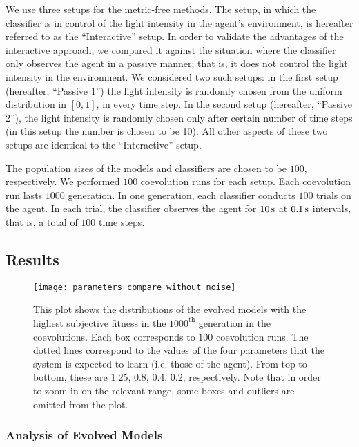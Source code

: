 We use three setups for the metric-free methods. The setup, in which the classifier is in control of the light intensity in the agent's environment, is hereafter referred to as the ``Interactive'' setup. In order to validate the advantages of the interactive approach, we compared it against the situation where the classifier only observes the agent in a passive manner; that is, it does not control the light intensity in the environment. We considered two such setups: in the first setup (hereafter, ``Passive 1'') the light intensity is randomly chosen from the uniform distribution in $\left[0,1\right]$, in every time step. In the second setup (hereafter, ``Passive 2''), the light intensity is randomly chosen only after certain number of time steps (in this setup the number is chosen to be 10). All other aspects of these two setups are identical to the ``Interactive'' setup. 

The population sizes of the models and classifiers are chosen to be $100$, respectively. We performed $100$ coevolution runs for each setup. Each coevolution run lasts $1000$ generation. In one generation, each classifier conducts $100$ trials on the agent. In each trial, the classifier observes the agent for $\unit[10]{s}$ at $\unit[0.1]{s}$ intervals, that is, a total of $100$ time steps.

\subsection{Results}\label{sec:results_interaction_deterministic}

\begin{figure}[!t]%
	\centering
	\texttt{[image: parameters\_compare\_without\_noise]}
	\caption{This plot shows the distributions of the evolved models with the highest subjective fitness in the $1000^\textrm{th}$ generation in the coevolutions. Each box corresponds to $100$ coevolution runs. The dotted lines correspond to the values of the four parameters that the system is expected to learn (i.e. those of the agent). From top to bottom, these are 1.25, 0.8, 0.4, 0.2, respectively. Note that in order to zoom in on the relevant range, some boxes and outliers are omitted from the plot.\label{fig:parameters_compare_without_noise}}
\end{figure}

\subsubsection{Analysis of Evolved Models}

